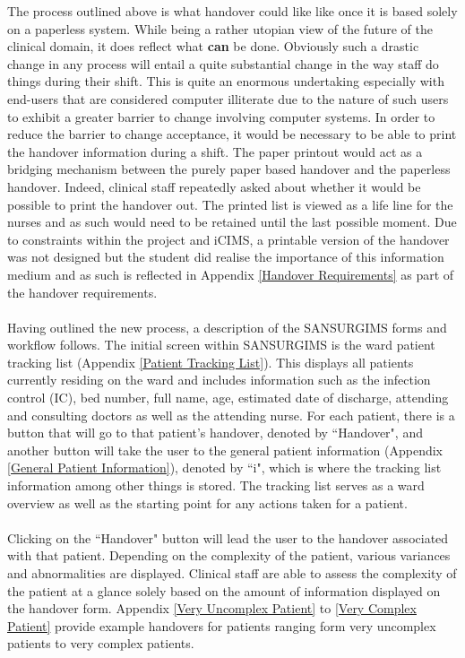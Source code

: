 \newpage
\noindent The process outlined above is what handover could like like once it is based solely on a paperless system. While being a rather utopian view of the future of the clinical domain, it does reflect what \textbf{can} be done. Obviously such a drastic change in any process will entail a quite substantial change in the way staff do things during their shift. This is quite an enormous undertaking especially with end-users that are considered computer illiterate due to the nature of such users to exhibit a greater barrier to change involving computer systems. In order to reduce the barrier to change acceptance, it would be necessary to be able to print the handover information during a shift. The paper printout would act as a bridging mechanism between the purely paper based handover and the paperless handover. Indeed, clinical staff repeatedly asked about whether it would be possible to print the handover out. The printed list is viewed as a life line for the nurses and as such would need to be retained until the last possible moment. Due to constraints within the project and iCIMS, a printable version of the handover was not designed but the student did realise the importance of this information medium and as such is reflected in Appendix \ref{Handover Requirements} as part of the handover requirements.
\\ \\
Having outlined the new process, a description of the SANSURGIMS forms and workflow follows. The initial screen within SANSURGIMS is the ward patient tracking list (Appendix \ref{Patient Tracking List}). This displays all patients currently residing on the ward and includes information such as the infection control (IC), bed number, full name, age, estimated date of discharge, attending and consulting doctors as well as the attending nurse. For each patient, there is a button that will go to that patient's handover, denoted by ``Handover", and another button will take the user to the general patient information (Appendix \ref{General Patient Information}), denoted by ``i", which is where the tracking list information among other things is stored. The tracking list serves as a ward overview as well as the starting point for any actions taken for a patient.
\\ \\
Clicking on the ``Handover" button will lead the user to the handover associated with that patient. Depending on the complexity of the patient, various variances and abnormalities are displayed. Clinical staff are able to assess the complexity of the patient at a glance solely based on the amount of information displayed on the handover form. Appendix \ref{Very Uncomplex Patient} to \ref{Very Complex Patient} provide example handovers for patients ranging form very uncomplex patients to very complex patients. 


